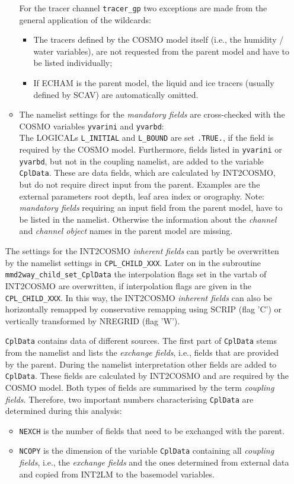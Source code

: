 \documentclass[11pt,twoside]{article}
\begin{document}
\begin{itemize}
\begin{itemize}
For the tracer channel \verb|tracer_gp| two exceptions are made from
the general application of the wildcards:
\begin{itemize}
\item The tracers defined by the COSMO model itself (i.e., the humidity / water
variables), are not requested
from the parent model and have to be listed individually;
\item If ECHAM is the parent model, the liquid and ice tracers (usually
defined by SCAV) are automatically omitted.
\end{itemize}
\item The namelist settings for the {\it mandatory fields} are 
cross-checked with the COSMO variables \verb|yvarini| and \verb|yvarbd|:\\ 
The {\footnotesize LOGICALs} 
\verb|L_INITIAL| and \verb|L_BOUND| are set \verb|.TRUE.|, if the field is 
required by the COSMO model. Furthermore, fields listed in \verb|yvarini| 
or \verb|yvarbd|, but not in the coupling namelist, are added to the variable \verb|CplData|. These are 
data fields, which are calculated by INT2COSMO, but do not require
 direct input from the parent. Examples are the external parameters
 root depth, leaf area index or orography.
Note: {\it mandatory fields} requiring an input field from the parent
model, have to be listed in the namelist. Otherwise the information about the 
{\it channel} and {\it channel object} names in the parent model are missing.
\end{itemize}%
The settings for the INT2COSMO {\it inherent fields} can partly be
overwritten by the namelist settings in \verb|CPL_CHILD_XXX|. Later on in the
subroutine \verb|mmd2way_child_set_CplData| the interpolation flags set in the
vartab of INT2COSMO are overwritten, if interpolation flags are given in the
  \verb|CPL_CHILD_XXX|. In this way, the INT2COSMO  {\it inherent fields} can
also be horizontally remapped by conservative remapping using SCRIP (flag 'C')
 or vertically transformed by NREGRID (flag 'W').


\verb|CplData| contains data of different sources. The first part of 
\verb|CplData| stems from the namelist and lists the {\it exchange fields},
i.e., 
 fields that are provided by the parent. During the namelist interpretation
other fields are added to \verb|CplData|. These fields are calculated by 
INT2COSMO and are required by the COSMO model. 
Both types of fields are summarised by the term {\it coupling fields}.
Therefore, two important numbers
characterising \verb|CplData| are determined during this analysis:
\begin{itemize}%
\item \verb|NEXCH| is the number of fields that need to be
exchanged with the parent.
\item \verb|NCOPY| is the dimension of the variable \verb|CplData| 
 containing all {\it coupling fields}, i.e., the {\it exchange fields} and
 the ones determined from external data and copied from INT2LM to the
 basemodel variables.
\end{itemize}%


\end{itemize}
\end{document}
